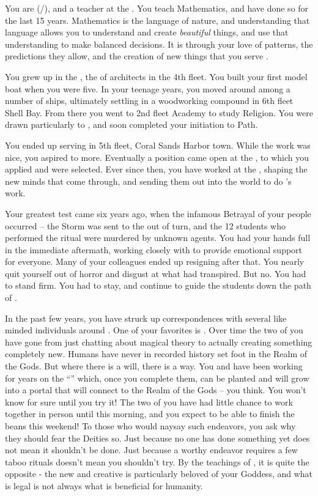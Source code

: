 \documentclass[char]{GL2020}
\begin{document}
\name{\cFlowPriest{}}

You are \cFlowPriest{\full} (\cFlowPriest{\they}/\cFlowPriest{\them}), and a teacher at the \pSchool{}. You teach Mathematics, and have done so for the last 15 years. Mathematics is the language of nature, and understanding that language allows you to understand and create \emph{beautiful} things, and use that understanding to make balanced decisions. It is through your love of patterns, the predictions they allow, and the creation of new things that you serve \cFlowFull{\full}.

You grew up in the \pShip{}, the \cFlowPriest{\child} of architects in the 4th fleet. You built your first model boat when you were five. In your teenage years, you moved around among a number of ships, ultimately settling in a woodworking compound in 6th fleet Shell Bay. From there you went to 2nd fleet Academy to study Religion. You were drawn particularly to \cFlow{}, and soon completed your initiation to \cFlow{\their} Path. 

You ended up serving in 5th fleet, Coral Sands Harbor town. While the work was nice, you aspired to more. Eventually a position came open at the \pSchool{}, to which you applied and were selected. Ever since then, you have worked at the \pSc{}, shaping the new minds that come through, and sending them out into the world to do \cFlow{}'s work.

Your greatest test came six years ago, when the infamous Betrayal of your people occurred – the Storm was sent to the \pShip{} out of turn, and the 12 students who performed the ritual were murdered by unknown agents. You had your hands full in the immediate aftermath, working closely with \cEthics{\full} to provide emotional support for everyone. Many of your colleagues ended up resigning after that. You nearly quit yourself out of horror and disgust at what had transpired. But no. You had to stand firm. You had to stay, and continue to guide the students down the path of \cFlow{}. 

In the past few years, you have struck up correspondences with several like minded individuals around \pEarth{}. One of your favorites is \cCurse{\full}. Over time the two of you have gone from just chatting about magical theory to actually creating something completely new. Humans have never in recorded history set foot in the Realm of the Gods. But where there is a will, there is a way. You and \cCurse{} have been working for years on the ``\iBeansMB{}'' which, once you complete them, can be planted and will grow into a portal that will connect \pEarth{} to the Realm of the Gods -- you think. You won't know for sure until you try it! The two of you have had little chance to work together in person until this morning, and you expect to be able to finish the beans this weekend! To those who would naysay such endeavors, you ask why they should fear the Deities so. Just because no one has done something yet does not mean it shouldn't be done. Just because a worthy endeavor requires a few taboo rituals doesn't mean you shouldn't try. By the teachings of \cFlow{}, it is quite the opposite - the new and creative is particularly beloved of your Goddess, and what is legal is not always what is beneficial for humanity.
\end{document}
